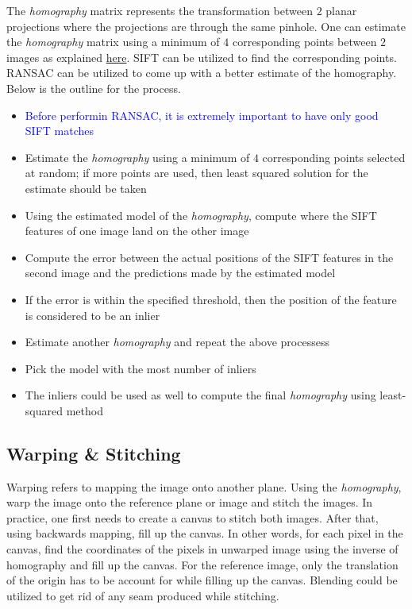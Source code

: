 \documentclass{report}
\begin{document}
The \textit{homography} matrix represents the transformation between $2$ planar projections where the projections are through the same pinhole. One can estimate the \textit{homography} matrix using a minimum of $4$ corresponding points between $2$ images as explained \href{https://www.youtube.com/watch?v=l_qjO4cM74o&list=PL2zRqk16wsdp8KbDfHKvPYNGF2L-zQASc&index=4}{here}. SIFT can be utilized to find the corresponding points. RANSAC can be utilized to come up with a better estimate of the homography. Below is the outline for the process.

\begin{itemize}
	\item \textcolor{blue}{Before performin RANSAC, it is extremely important to have only good SIFT matches}
	\item Estimate the \textit{homography} using a minimum of $4$ corresponding points selected at random; if more points are used, then least squared solution for the estimate should be taken
	\item Using the estimated model of the \textit{homography}, compute where the SIFT features of one image land on the other image
	\item Compute the error between the actual positions of the SIFT features in the second image and the predictions made by the estimated model
	\item If the error is within the specified threshold, then the position of the feature is considered to be an inlier
	\item Estimate another \textit{homography} and repeat the above processess
	\item Pick the model with the most number of inliers
	\item The inliers could be used as well to compute the final \textit{homography} using least-squared method
\end{itemize}

\subsection{Warping \& Stitching}
\hspace{\parindent}Warping refers to mapping the image onto another plane. Using the \textit{homography}, warp the image onto the reference plane or image and stitch the images. In practice, one first needs to create a canvas to stitch both images. After that, using backwards mapping, fill up the canvas. In other words, for each pixel in the canvas, find the coordinates of the pixels in unwarped image using the inverse of homography and fill up the canvas. For the reference image, only the translation of the origin has to be account for while filling up the canvas. Blending could be utilized to get rid of any seam produced while stitching.
\end{document}

